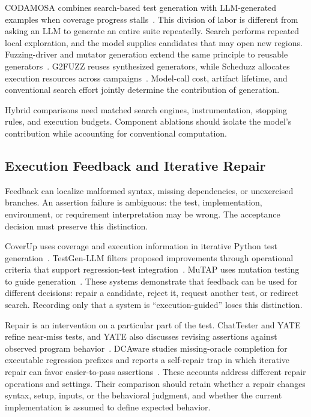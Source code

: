 CODAMOSA combines search-based test generation with LLM-generated examples when coverage progress stalls~\cite{U04}. This division of labor is different from asking an LLM to generate an entire suite repeatedly. Search performs repeated local exploration, and the model supplies candidates that may open new regions. Fuzzing-driver and mutator generation extend the same principle to reusable generators~\cite{F05,F06,F07}. G2FUZZ reuses synthesized generators, while Scheduzz allocates execution resources across campaigns~\cite{F08,F10}. Model-call cost, artifact lifetime, and conventional search effort jointly determine the contribution of generation.

Hybrid comparisons need matched search engines, instrumentation, stopping rules, and execution budgets. Component ablations should isolate the model's contribution while accounting for conventional computation.

\subsection{Execution Feedback and Iterative Repair}
Feedback can localize malformed syntax, missing dependencies, or unexercised branches. An assertion failure is ambiguous: the test, implementation, environment, or requirement interpretation may be wrong. The acceptance decision must preserve this distinction.

CoverUp uses coverage and execution information in iterative Python test generation~\cite{U05}. TestGen-LLM filters proposed improvements through operational criteria that support regression-test integration~\cite{U07}. MuTAP uses mutation testing to guide generation~\cite{U06}. These systems demonstrate that feedback can be used for different decisions: repair a candidate, reject it, request another test, or redirect search. Recording only that a system is ``execution-guided'' loses this distinction.

Repair is an intervention on a particular part of the test. ChatTester and YATE refine near-miss tests, and YATE also discusses revising assertions against observed program behavior~\cite{U18,E09}. DCAware studies missing-oracle completion for executable regression prefixes and reports a self-repair trap in which iterative repair can favor easier-to-pass assertions~\cite{O13}. These accounts address different repair operations and settings. Their comparison should retain whether a repair changes syntax, setup, inputs, or the behavioral judgment, and whether the current implementation is assumed to define expected behavior.

